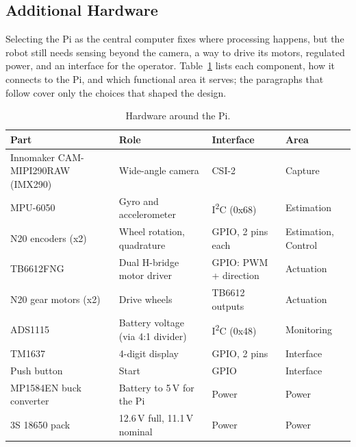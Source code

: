 \subsection{Additional Hardware}
Selecting the Pi as the central computer fixes where processing happens, but
the robot still needs sensing beyond the camera, a way to drive its motors,
regulated power, and an interface for the operator. Table~\ref{tab:hardware}
lists each component, how it connects to the Pi, and which functional area it
serves; the paragraphs that follow cover only the choices that shaped the
design.

\begin{table}[H]
      \centering
      \caption{Hardware around the Pi.}
      \label{tab:hardware}
      \small
      \begin{tabularx}{\textwidth}{@{}XXXX@{}}
            \toprule
            \textbf{Part}                     & \textbf{Role}                     & \textbf{Interface}           & \textbf{Area}       \\
            \midrule
            Innomaker CAM-MIPI290RAW (IMX290) & Wide-angle camera                 & CSI-2                        & Capture             \\
            MPU-6050                          & Gyro and accelerometer            & I\textsuperscript{2}C (0x68) & Estimation          \\
            N20 encoders (x2)                 & Wheel rotation, quadrature        & GPIO, 2 pins each            & Estimation, Control \\
            TB6612FNG                         & Dual H-bridge motor driver        & GPIO: PWM + direction        & Actuation           \\
            N20 gear motors (x2)              & Drive wheels                      & TB6612 outputs               & Actuation           \\
            ADS1115                           & Battery voltage (via 4:1 divider) & I\textsuperscript{2}C (0x48) & Monitoring          \\
            TM1637                            & 4-digit display                   & GPIO, 2 pins                 & Interface           \\
            Push button                       & Start                             & GPIO                         & Interface           \\
            MP1584EN buck converter           & Battery to 5\,V for the Pi        & Power                        & Power               \\
            3S 18650 pack                     & 12.6\,V full, 11.1\,V nominal     & Power                        & Power               \\
            \bottomrule
      \end{tabularx}
\end{table}

